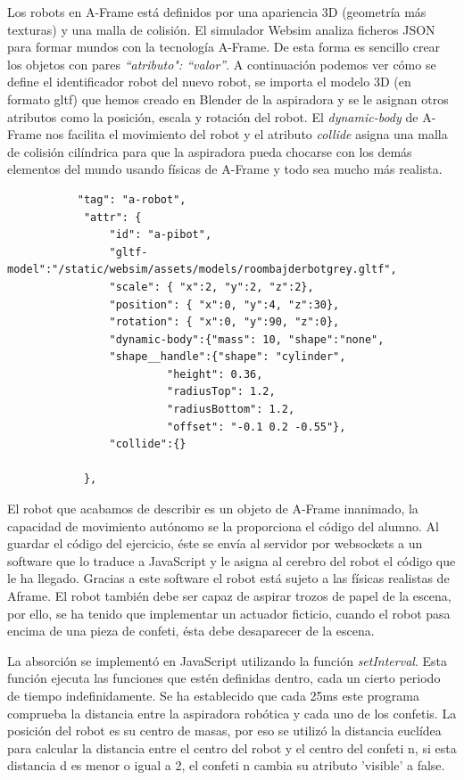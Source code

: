 Los robots en A-Frame está definidos por una apariencia 3D (geometría más texturas) y una malla de colisión.
El simulador Websim analiza ficheros JSON para formar mundos con la tecnología A-Frame. De esta forma es sencillo crear los objetos con pares \textit{``atributo": ``valor''}. A continuación podemos ver cómo se define el identificador robot del nuevo robot, se importa el modelo 3D (en formato gltf) que hemos creado en Blender de la aspiradora y se le asignan otros atributos como la posición, escala y rotación del robot. El \textit{dynamic-body} de A-Frame nos facilita el movimiento del robot y el atributo \textit{collide} asigna una malla de colisión cilíndrica para que la aspiradora pueda chocarse con los demás elementos del mundo usando físicas de A-Frame y todo sea mucho más realista.


\begin{lstlisting}
           "tag": "a-robot",
            "attr": {
                "id": "a-pibot",
                "gltf-model":"/static/websim/assets/models/roombajderbotgrey.gltf",
                "scale": { "x":2, "y":2, "z":2},
                "position": { "x":0, "y":4, "z":30},
                "rotation": { "x":0, "y":90, "z":0},
                "dynamic-body":{"mass": 10, "shape":"none",
                "shape__handle":{"shape": "cylinder",
                         "height": 0.36,
                         "radiusTop": 1.2,
                         "radiusBottom": 1.2,
                         "offset": "-0.1 0.2 -0.55"},
                "collide":{}

            },
\end{lstlisting}

El robot que acabamos de describir es un objeto de A-Frame inanimado, la capacidad de movimiento autónomo se la proporciona el código del alumno. Al guardar el código del ejercicio, éste se envía al servidor por websockets a un software que lo traduce a JavaScript y le asigna al cerebro del robot el código que le ha llegado. Gracias a este software el robot está sujeto a las físicas realistas de Aframe.
El robot  también debe ser capaz de aspirar trozos de papel de la escena, por ello, se ha tenido que implementar un actuador ficticio, cuando el robot pasa encima de una pieza de confeti, ésta debe desaparecer de la escena.

La absorción se implementó en JavaScript utilizando la función \textit{setInterval}. Esta función ejecuta las funciones que estén definidas dentro, cada un cierto periodo de tiempo indefinidamente.
Se ha establecido que cada 25ms este programa comprueba la distancia entre la aspiradora robótica y cada uno de los confetis. La posición del robot es su centro de masas, por eso se  utilizó la distancia euclídea para calcular la distancia entre el centro del robot y el centro del confeti n, si esta distancia d es menor o igual a 2, el confeti n cambia su atributo 'visible' a false. 

